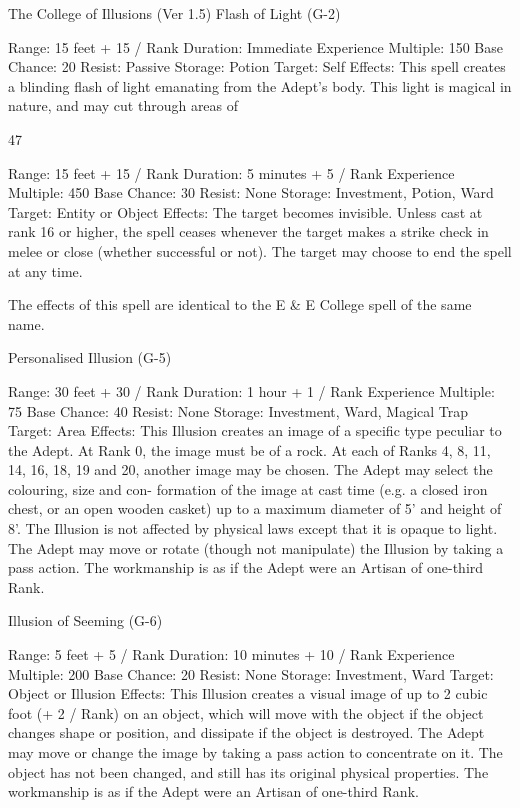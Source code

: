 \begin{Chapter}{The College of Illusions (Ver 1.5)}
Flash of Light (G-2) 

Range: 15 feet + 15 / Rank 
Duration: Immediate 
Experience Multiple: 150 
Base Chance: 20%
Resist: Passive 
Storage: Potion 
Target: Self 
Effects:  This  spell  creates  a  blinding  flash  of  light 
emanating  from  the  Adept’s  body.  This  light  is 
magical  in  nature,  and  may  cut  through  areas  of 

47 

Range: 15 feet + 15 / Rank 
Duration: 5 minutes + 5 / Rank 
Experience Multiple: 450 
Base Chance: 30%
Resist: None 
Storage: Investment, Potion, Ward 
Target: Entity or Object 
Effects:  The  target  becomes  invisible.  Unless  cast 
at rank 16 or higher, the spell ceases whenever the 
target  makes  a  strike  check  in  melee  or  close 
(whether successful or not). The target may choose 
to end the spell at any time. 

The effects of this spell are identical to the E \& E College spell of
the same name.

Personalised Illusion (G-5) 

Range: 30 feet + 30 / Rank 
Duration: 1 hour + 1 / Rank 
Experience Multiple: 75 
Base Chance: 40%
Resist: None 
Storage: Investment, Ward, Magical Trap 
Target: Area 
Effects: This Illusion creates an image of a specific 
type  peculiar  to  the  Adept.  At  Rank  0,  the  image 
must  be  of  a  rock.  At  each  of  Ranks  4,  8,  11,  14, 
16,  18,  19  and  20,  another  image  may  be  chosen. 
The Adept may select the colouring, size and con-
formation  of  the  image  at  cast  time  (e.g.  a  closed 
iron  chest,  or  an  open  wooden  casket)  up  to  a 
maximum  diameter  of  5’  and  height  of  8’.  The 
Illusion is not affected by physical laws except that 
it is opaque to light. The Adept may move or rotate 
(though  not  manipulate)  the  Illusion  by  taking  a 
pass  action.  The  workmanship  is  as  if  the  Adept 
were an Artisan of one-third Rank. 

Illusion of Seeming (G-6) 

Range: 5 feet + 5 / Rank 
Duration: 10 minutes + 10 / Rank 
Experience Multiple: 200 
Base Chance: 20%
Resist: None 
Storage: Investment, Ward 
Target: Object or Illusion 
Effects:  This  Illusion  creates  a  visual  image  of  up 
to  2  cubic  foot  (+  2  /  Rank)  on  an  object,  which 
will  move  with  the  object  if  the  object  changes 
shape  or  position,  and  dissipate  if  the  object  is 
destroyed.  The  Adept  may  move  or  change  the 
image by taking a pass action to concentrate on it. 
The  object  has  not  been  changed,  and  still  has  its 
original  physical  properties.  The  workmanship  is 
as if the Adept were an Artisan of one-third Rank. 


\end{Chapter}
